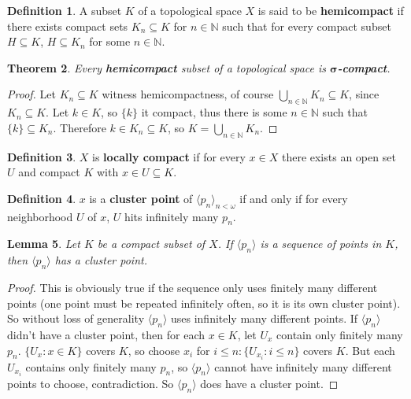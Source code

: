 \documentclass{amsart}
\theoremstyle{plain}
\newtheorem{theorem}{Theorem}
\newtheorem{lemma}[theorem]{Lemma}
\theoremstyle{definition}
\newtheorem{definition}[theorem]{Definition}
\theoremstyle{remark}
\begin{document}
	\begin{definition}
	  A subset \(K\) of a topological space \(X\) is said to be \textbf{hemicompact} if there exists compact sets $K_n \subseteq K$ for $n \in \mathbb{N}$ such that for every compact subset \(H\subseteq K\), \(H\subseteq K_n\) for some \(n\in\mathbb N\).
	\end{definition}

	\begin{theorem}
		Every \textbf{hemicompact} subset of a topological space is \(\boldsymbol{\sigma}\)\textbf{-compact}.
	\end{theorem}
	\begin{proof}
		Let $K_n \subseteq K$ witness hemicompactness, of course $\underset{n \in \mathbb{N}}{\bigcup}K_n \subseteq K$, since $K_n \subseteq K$. Let $k \in K$, so $\lbrace k \rbrace$ it compact, thus there is some $n \in \mathbb{N}$ such that $\lbrace k \rbrace \subseteq K_n$. Therefore $k \in K_n \subseteq K$, so $K = \underset{n \in \mathbb{N}}{\bigcup}K_n$.
	\end{proof}

	\begin{definition}
		$X$ is \textbf{locally compact} if for every $x \in X$ there exists an open set $U$ and compact $K$ with $x \in U \subseteq K$.
	\end{definition}
	
	\begin{definition}
		$x$ is a \textbf{cluster point} of $\langle p_n \rangle_{n < \omega}$ if and only if for every neighborhood $U$ of $x$, $U$ hits infinitely many $p_n$.
	\end{definition}

	\begin{lemma}
	Let $K$ be a compact subset of $X$. If $\langle p_n \rangle$ is a sequence of points in $K$, then $\langle p_n \rangle$ has a cluster point.
	\end{lemma}
	\begin{proof}
	This is obviously true if the sequence only uses finitely many different points (one point must be repeated infinitely often, so it is its own cluster point). So without loss of generality $\langle p_n \rangle$ uses infinitely many different points. If $\langle p_n \rangle$ didn't have a cluster point, then for each $x \in K$, let $U_x$ contain only finitely many $p_n$. $\lbrace U_x : x \in K \rbrace$ covers $K$, so choose $x_i$ for $i \leq n : \lbrace U_{x_i} : i \leq n \rbrace$ covers $K$. But each $U_{x_i}$ contains only finitely many $p_n$, so $\langle p_n \rangle$ cannot have infinitely many different points to choose, contradiction. So $\langle p_n \rangle$ does have a cluster point.
	\end{proof}
\end{document}
